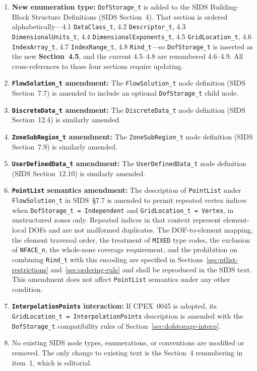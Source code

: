 \documentclass[11pt,letterpaper]{article}
\begin{document}
\begin{enumerate}[leftmargin=2em]
\item \textbf{New enumeration type:} \texttt{DofStorage\_t}
  is added to the SIDS Building-Block Structure Definitions
  (SIDS Section~4).  That section is ordered alphabetically---4.1
  \texttt{DataClass\_t}, 4.2 \texttt{Descriptor\_t}, 4.3
  \texttt{DimensionalUnits\_t}, 4.4
  \texttt{DimensionalExponents\_t}, 4.5 \texttt{GridLocation\_t}, 4.6
  \texttt{IndexArray\_t}, 4.7 \texttt{IndexRange\_t}, 4.8
  \texttt{Rind\_t}---so \texttt{DofStorage\_t} is inserted as the new
  \textbf{Section~4.5}, and the current 4.5--4.8 are renumbered
  4.6--4.9.  All cross-references to those four sections require
  updating.

\item \textbf{\texttt{FlowSolution\_t} amendment:} The
  \texttt{FlowSolution\_t} node definition (SIDS Section~7.7) is
  amended to include an optional
  \texttt{DofStorage\_t} child node.

\item \textbf{\texttt{DiscreteData\_t} amendment:} The
  \texttt{DiscreteData\_t} node definition (SIDS Section~12.4) is
  similarly amended.

\item \textbf{\texttt{ZoneSubRegion\_t} amendment:} The
  \texttt{ZoneSubRegion\_t} node definition (SIDS Section~7.9) is
  similarly amended.

\item \textbf{\texttt{UserDefinedData\_t} amendment:} The
  \texttt{UserDefinedData\_t} node definition (SIDS Section~12.10) is
  similarly amended.

\item \textbf{\texttt{PointList} semantics amendment:} The description of
  \texttt{PointList} under \texttt{FlowSolution\_t} in SIDS~\S7.7 is
  amended to permit repeated vertex indices when
  \texttt{DofStorage\_t = Independent} and
  \texttt{GridLocation\_t = Vertex}, in unstructured zones only.
  Repeated indices in that context represent element-local DOFs and are
  not malformed duplicates.  The DOF-to-element mapping, the element
  traversal order, the treatment of \texttt{MIXED} type codes, the
  exclusion of \texttt{NFACE\_n}, the whole-zone coverage requirement,
  and the prohibition on combining \texttt{Rind\_t} with this encoding
  are specified in Sections~\ref{sec:ptlist-restrictions}
  and~\ref{sec:ordering-rule} and shall be reproduced in the SIDS text.
  This amendment does not affect \texttt{PointList}
  semantics under any other condition.

\item \textbf{\texttt{InterpolationPoints} interaction:} If CPEX~0045 is
  adopted, its \texttt{GridLocation\_t = InterpolationPoints}
  description is amended with the \texttt{DofStorage\_t}
  compatibility rules of Section~\ref{sec:dofstorage-interp}.

\item No existing SIDS node types, enumerations, or conventions are
  modified or removed.  The only change to existing text is the
  Section~4 renumbering in item~1, which is editorial.
\end{enumerate}
\end{document}
